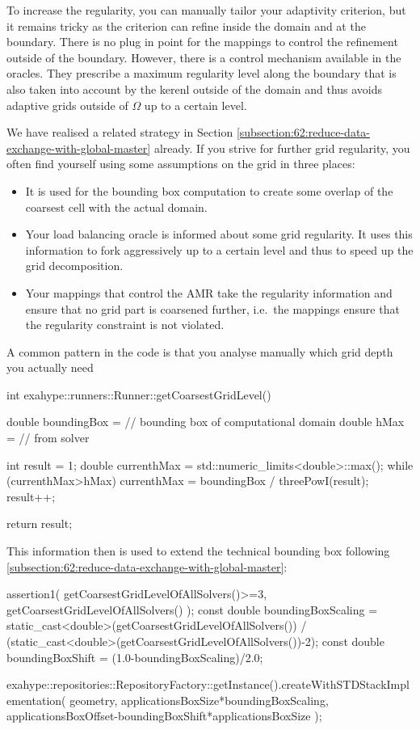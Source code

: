 \noindent
To increase the regularity, you can manually tailor your adaptivity criterion,
but it remains tricky as the criterion can refine inside the domain and at the
boundary.
There is no plug in point for the mappings to control the refinement outside of
the boundary. 
However, there is a control mechanism available in the oracles.
They prescribe a maximum regularity level along the boundary that is 
also taken into account by the kerenl outside of the domain and thus avoids
adaptive grids outside of $\Omega $ up to a certain level.

We have realised a related strategy in Section
\ref{subsection:62:reduce-data-exchange-with-global-master} already. 
If you strive for further grid regularity, you often find yourself using some
assumptions on the grid in three places:
\begin{itemize}
  \item It is used for the bounding box computation to create some overlap of
  the coarsest cell with the actual domain.
  \item Your load balancing oracle is informed about some grid regularity. It
  uses this information to fork aggressively up to a certain level and thus to
  speed up the grid decomposition.
  \item Your mappings that control the AMR take the regularity information and
  ensure that no grid part is coarsened further, i.e.~the mappings ensure that
  the regularity constraint is not violated.
\end{itemize}

\noindent
A common pattern in the code is that you analyse manually which grid depth you
actually need
\begin{code}
int exahype::runners::Runner::getCoarsestGridLevel() {
  double boundingBox =  // bounding box of computational domain
  double hMax        =  // from solver

  int    result      = 1;
  double currenthMax = std::numeric_limits<double>::max();
  while (currenthMax>hMax) {
    currenthMax = boundingBox / threePowI(result);
    result++;
  }

  return result;
}
\end{code}

\noindent
This information then is used to extend the technical bounding box following  
\ref{subsection:62:reduce-data-exchange-with-global-master}:
\begin{code}
  assertion1( getCoarsestGridLevelOfAllSolvers()>=3, getCoarsestGridLevelOfAllSolvers() ); 
  const double boundingBoxScaling = 
    static_cast<double>(getCoarsestGridLevelOfAllSolvers()) /
    (static_cast<double>(getCoarsestGridLevelOfAllSolvers())-2); 
  const double boundingBoxShift   = (1.0-boundingBoxScaling)/2.0; 
  
  exahype::repositories::RepositoryFactory::getInstance().createWithSTDStackImplementation(
      geometry,
      applicationsBoxSize*boundingBoxScaling,
      applicationsBoxOffset-boundingBoxShift*applicationsBoxSize
      );
\end{code}

